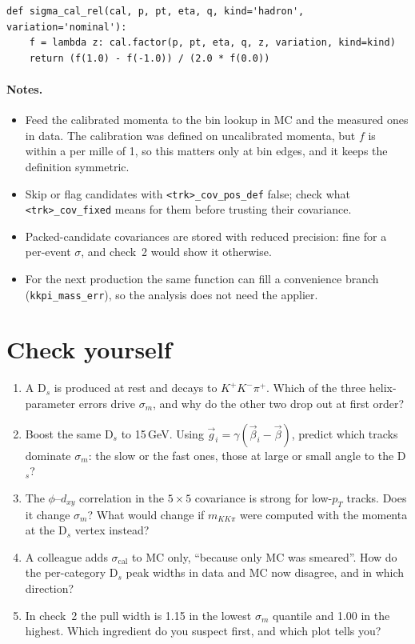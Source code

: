 \documentclass[11pt,a4paper]{article}
\newcommand{\vb}[1]{\vec{#1}}
\newcommand{\br}[1]{\texttt{#1}}
\newcommand{\scal}{\sigma_{\mathrm{cal}}}
\newcommand{\mKKpi}{m_{KK\pi}}
\begin{document}
\begin{lstlisting}
def sigma_cal_rel(cal, p, pt, eta, q, kind='hadron', variation='nominal'):
    f = lambda z: cal.factor(p, pt, eta, q, z, variation, kind=kind)
    return (f(1.0) - f(-1.0)) / (2.0 * f(0.0))
\end{lstlisting}

\paragraph{Notes.}
\begin{itemize}
  \item Feed the calibrated momenta to the bin lookup in MC and the measured ones in data. The calibration was
        defined on uncalibrated momenta, but $f$ is within a per mille of 1, so this matters only at bin edges,
        and it keeps the definition symmetric.
  \item Skip or flag candidates with \br{<trk>\_cov\_pos\_def} false; check what \br{<trk>\_cov\_fixed} means
        for them before trusting their covariance.
  \item Packed-candidate covariances are stored with reduced precision: fine for a per-event $\sigma$, and
        check~2 would show it otherwise.
  \item For the next production the same function can fill a convenience branch (\br{kkpi\_mass\_err}), so the
        analysis does not need the applier.
\end{itemize}

\section{Check yourself}

\begin{enumerate}[label=\textbf{\arabic*.}]
  \item A D$_s$ is produced at rest and decays to $K^+K^-\pi^+$. Which of the three helix-parameter errors
        drive $\sigma_m$, and why do the other two drop out at first order?
  \item Boost the same D$_s$ to 15\,GeV. Using $\vb g_i = \gamma(\vb\beta_i-\vb\beta)$, predict which tracks
        dominate $\sigma_m$: the slow or the fast ones, those at large or small angle to the D$_s$?
  \item The $\phi$--$d_{xy}$ correlation in the $5\times5$ covariance is strong for low-$p_T$ tracks. Does it
        change $\sigma_m$? What would change if $\mKKpi$ were computed with the momenta at the D$_s$ vertex
        instead?
  \item A colleague adds $\scal$ to MC only, ``because only MC was smeared''. How do the per-category D$_s$
        peak widths in data and MC now disagree, and in which direction?
  \item In check~2 the pull width is 1.15 in the lowest $\sigma_m$ quantile and 1.00 in the highest. Which
        ingredient do you suspect first, and which plot tells you?
\end{enumerate}
\end{document}
